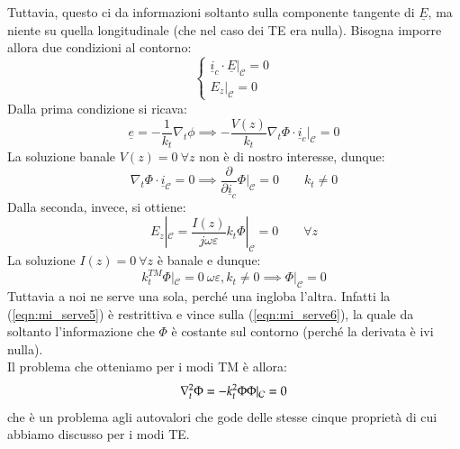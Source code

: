 \documentclass{book}
\begin{document}
    Tuttavia, questo ci da informazioni soltanto sulla componente tangente di $\underline{E}$, ma niente su quella longitudinale
    (che nel caso dei TE era nulla). Bisogna imporre allora due condizioni al contorno:
    \begin{equation}
        \begin{cases}
            \underline{i}_{c} \cdot \underline{E}|_{\mathcal{C}} = 0 \\
            E_{z}|_{\mathcal{C}} = 0
        \end{cases}
    \end{equation}
    Dalla prima condizione si ricava:
    \begin{equation}
        \underline{e} = - \frac{1}{k_{t}} \nabla_{t} \phi \implies -\frac{V(z)}{k_{t}} \nabla_{t} \Phi \cdot \underline{i}_{c}|_{\mathcal{C}} = 0
    \end{equation}
    La soluzione banale $V(z)=0 \ \forall z$ non è di nostro interesse, dunque:
    \begin{equation}
        \nabla_{t} \Phi \cdot \underline{i}_{\mathcal{C}} = 0 \implies \frac{\partial}{\partial \underline{i}_{c}} \Phi|_{\mathcal{C}} = 0 \qquad k_{t} \neq 0 
    \end{equation}
    Dalla seconda, invece, si ottiene:
    \begin{equation}
        \label{eqn:mi_serve6}
        E_{z}|_{\mathcal{C}} = \frac{I(z)}{j \omega \varepsilon} k_{t}\Phi|_{\mathcal{C}} = 0 \qquad \forall z
    \end{equation}
    La soluzione $I(z) = 0 \ \forall z$ è banale e dunque:
    \begin{equation}
        \label{eqn:mi_serve5}
        k_{t} ^{TM} \Phi|_{\mathcal{C}} = 0 \  \omega \varepsilon, k_{t} \neq 0 \implies \Phi|_{\mathcal{C}} = 0 
    \end{equation}
    Tuttavia a noi ne serve una sola, perché una ingloba l'altra. Infatti la (\ref{eqn:mi_serve5}) è restrittiva e vince sulla 
    (\ref{eqn:mi_serve6}), la quale da soltanto l'informazione che $\Phi$ è costante sul contorno (perché la derivata è ivi nulla). \\
    Il problema che otteniamo per i modi TM è allora:
    \begin{equation}
        \nabla_{t} ^{2} \Phi = - k_{t} ^{2} \Phi \\
        \Phi|_{\mathcal{C}} = 0
    \end{equation}
    che è un problema agli autovalori che gode delle stesse cinque proprietà di cui abbiamo 
    discusso per i modi TE. \\ \\
\end{document}

